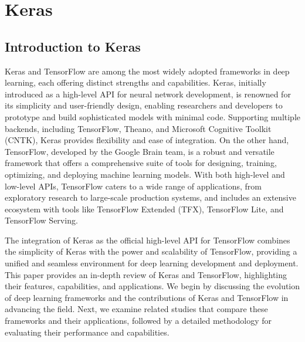 %
%
%
\chapter{Keras}

\section*{Introduction to Keras}

	Keras and TensorFlow are among the most widely adopted frameworks in deep learning, each offering distinct strengths and capabilities.\cite{Jsaer:2024} Keras, initially introduced as a high-level API for neural network development, is renowned for its simplicity and user-friendly design, enabling researchers and developers to prototype and build sophisticated models with minimal code. Supporting multiple backends, including TensorFlow, Theano, and Microsoft Cognitive Toolkit (CNTK), Keras provides flexibility and ease of integration.\cite{Jsaer:2024} On the other hand, TensorFlow, developed by the Google Brain team, is a robust and versatile framework that offers a comprehensive suite of tools for designing, training, optimizing, and deploying machine learning models.\cite{Jsaer:2024} With both high-level and low-level APIs, TensorFlow caters to a wide range of applications, from exploratory research to large-scale production systems, and includes an extensive ecosystem with tools like TensorFlow Extended (TFX), TensorFlow Lite, and TensorFlow Serving.\cite{Jsaer:2024}
	
	The integration of Keras as the official high-level API for TensorFlow combines the simplicity of Keras with the power and scalability of TensorFlow, providing a unified and seamless environment for deep learning development and deployment.\cite{Jsaer:2024} This paper provides an in-depth review of Keras and TensorFlow, highlighting their features, capabilities, and applications. We begin by discussing the evolution of deep learning frameworks and the contributions of Keras and TensorFlow in advancing the field. Next, we examine related studies that compare these frameworks and their applications, followed by a detailed methodology for evaluating their performance and capabilities.\cite{Jsaer:2024}

